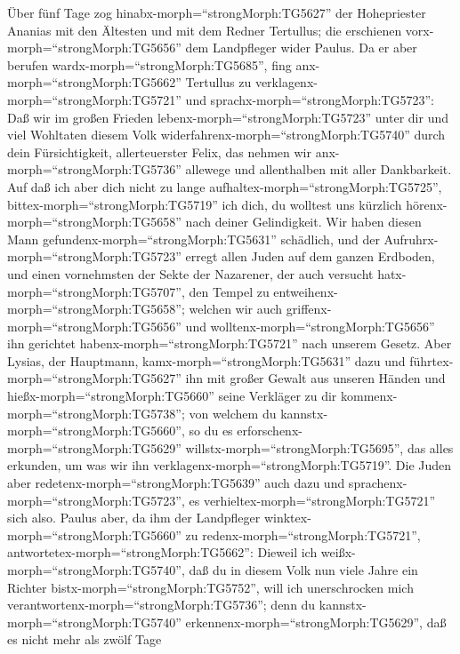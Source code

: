  Über fünf Tage zog hinabx-morph=``strongMorph:TG5627'' der
Hohepriester Ananias mit den Ältesten und mit dem Redner Tertullus; die
erschienen vorx-morph=``strongMorph:TG5656'' dem Landpfleger wider
Paulus.  Da er aber berufen
wardx-morph=``strongMorph:TG5685'', fing
anx-morph=``strongMorph:TG5662'' Tertullus zu
verklagenx-morph=``strongMorph:TG5721'' und
sprachx-morph=``strongMorph:TG5723'':  Daß wir im großen
Frieden lebenx-morph=``strongMorph:TG5723'' unter dir und viel Wohltaten
diesem Volk widerfahrenx-morph=``strongMorph:TG5740'' durch dein
Fürsichtigkeit, allerteuerster Felix, das nehmen wir
anx-morph=``strongMorph:TG5736'' allewege und allenthalben mit aller
Dankbarkeit.  Auf daß ich aber dich nicht zu lange
aufhaltex-morph=``strongMorph:TG5725'',
bittex-morph=``strongMorph:TG5719'' ich dich, du wolltest uns kürzlich
hörenx-morph=``strongMorph:TG5658'' nach deiner Gelindigkeit.
 Wir haben diesen Mann
gefundenx-morph=``strongMorph:TG5631'' schädlich, und der
Aufruhrx-morph=``strongMorph:TG5723'' erregt allen Juden auf dem ganzen
Erdboden, und einen vornehmsten der Sekte der Nazarener, 
der auch versucht hatx-morph=``strongMorph:TG5707'', den Tempel zu
entweihenx-morph=``strongMorph:TG5658''; welchen wir auch
griffenx-morph=``strongMorph:TG5656'' und
wolltenx-morph=``strongMorph:TG5656'' ihn gerichtet
habenx-morph=``strongMorph:TG5721'' nach unserem Gesetz. 
Aber Lysias, der Hauptmann, kamx-morph=``strongMorph:TG5631'' dazu und
führtex-morph=``strongMorph:TG5627'' ihn mit großer Gewalt aus unseren
Händen  und hießx-morph=``strongMorph:TG5660'' seine
Verkläger zu dir kommenx-morph=``strongMorph:TG5738''; von welchem du
kannstx-morph=``strongMorph:TG5660'', so du es
erforschenx-morph=``strongMorph:TG5629''
willstx-morph=``strongMorph:TG5695'', das alles erkunden, um was wir ihn
verklagenx-morph=``strongMorph:TG5719''.  Die Juden aber
redetenx-morph=``strongMorph:TG5639'' auch dazu und
sprachenx-morph=``strongMorph:TG5723'', es
verhieltex-morph=``strongMorph:TG5721'' sich also.  Paulus
aber, da ihm der Landpfleger winktex-morph=``strongMorph:TG5660'' zu
redenx-morph=``strongMorph:TG5721'',
antwortetex-morph=``strongMorph:TG5662'': Dieweil ich
weißx-morph=``strongMorph:TG5740'', daß du in diesem Volk nun viele
Jahre ein Richter bistx-morph=``strongMorph:TG5752'', will ich
unerschrocken mich verantwortenx-morph=``strongMorph:TG5736'';
 denn du kannstx-morph=``strongMorph:TG5740''
erkennenx-morph=``strongMorph:TG5629'', daß es nicht mehr als zwölf Tage
